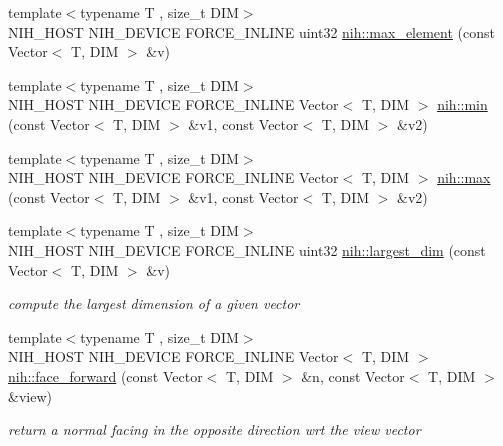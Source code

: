 \begin{DoxyCompactItemize}
\item 
{\footnotesize template$<$typename T , size\-\_\-t \-D\-I\-M$>$ }\\\-N\-I\-H\-\_\-\-H\-O\-S\-T \-N\-I\-H\-\_\-\-D\-E\-V\-I\-C\-E \*
\-F\-O\-R\-C\-E\-\_\-\-I\-N\-L\-I\-N\-E uint32 \hyperlink{group__vectors_ga549a2d3c8b77b652dc1cd56c1d119b77}{nih\-::max\-\_\-element} (const \-Vector$<$ \-T, \-D\-I\-M $>$ \&v)
\item 
{\footnotesize template$<$typename T , size\-\_\-t \-D\-I\-M$>$ }\\\-N\-I\-H\-\_\-\-H\-O\-S\-T \-N\-I\-H\-\_\-\-D\-E\-V\-I\-C\-E \*
\-F\-O\-R\-C\-E\-\_\-\-I\-N\-L\-I\-N\-E \-Vector$<$ \-T, \-D\-I\-M $>$ \hyperlink{group__vectors_ga5809911d15c32de18955c59865379695}{nih\-::min} (const \-Vector$<$ \-T, \-D\-I\-M $>$ \&v1, const \-Vector$<$ \-T, \-D\-I\-M $>$ \&v2)
\item 
{\footnotesize template$<$typename T , size\-\_\-t \-D\-I\-M$>$ }\\\-N\-I\-H\-\_\-\-H\-O\-S\-T \-N\-I\-H\-\_\-\-D\-E\-V\-I\-C\-E \*
\-F\-O\-R\-C\-E\-\_\-\-I\-N\-L\-I\-N\-E \-Vector$<$ \-T, \-D\-I\-M $>$ \hyperlink{group__vectors_gab2b34b1991185fc29890973777b60e54}{nih\-::max} (const \-Vector$<$ \-T, \-D\-I\-M $>$ \&v1, const \-Vector$<$ \-T, \-D\-I\-M $>$ \&v2)
\item 
{\footnotesize template$<$typename T , size\-\_\-t \-D\-I\-M$>$ }\\\-N\-I\-H\-\_\-\-H\-O\-S\-T \-N\-I\-H\-\_\-\-D\-E\-V\-I\-C\-E \*
\-F\-O\-R\-C\-E\-\_\-\-I\-N\-L\-I\-N\-E uint32 \hyperlink{group__vectors_ga22cda565844e9049dd1438a376c2e198}{nih\-::largest\-\_\-dim} (const \-Vector$<$ \-T, \-D\-I\-M $>$ \&v)
\begin{DoxyCompactList}\small\item\em compute the largest dimension of a given vector \end{DoxyCompactList}\item 
{\footnotesize template$<$typename T , size\-\_\-t \-D\-I\-M$>$ }\\\-N\-I\-H\-\_\-\-H\-O\-S\-T \-N\-I\-H\-\_\-\-D\-E\-V\-I\-C\-E \*
\-F\-O\-R\-C\-E\-\_\-\-I\-N\-L\-I\-N\-E \-Vector$<$ \-T, \-D\-I\-M $>$ \hyperlink{group__vectors_ga396a9bd50b2cf3f00afd4f806ce544f3}{nih\-::face\-\_\-forward} (const \-Vector$<$ \-T, \-D\-I\-M $>$ \&n, const \-Vector$<$ \-T, \-D\-I\-M $>$ \&view)
\begin{DoxyCompactList}\small\item\em return a normal facing in the opposite direction wrt the view vector \end{DoxyCompactList}\item 

\end{DoxyCompactItemize}
